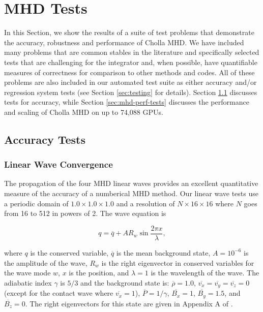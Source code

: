 \section{MHD Tests}
\label{sec:mhd-tests}

In this Section, we show the results of a suite of test problems that demonstrate the accuracy, robustness and performance of Cholla MHD. We have included many problems that are common stables in the literature and specifically selected tests that are challenging for the integrator and, when possible, have quantifiable measures of correctness for comparison to other methods and codes. All of these problems are also included in our automated test suite as either accuracy and/or regression system tests (see Section \ref{sec:testing} for details). Section \ref{sec:accuracy_tests} discusses tests for accuracy, while Section \ref{sec:mhd-perf-tests} discusses the performance and scaling of Cholla MHD on up to 74,088 GPUs.

\subsection{Accuracy Tests}
\label{sec:accuracy_tests}

\subsubsection{Linear Wave Convergence}
\label{sec:lwc}

The propagation of the four MHD linear waves provides an excellent quantitative measure of the accuracy of a numberical MHD method. Our linear wave tests use a periodic domain of $1.0\times1.0\times1.0$ and a resolution of $N\times16\times16$ where $N$ goes from 16 to 512 in powers of 2. The wave equation is

\begin{equation}
    q = \overline{q} + A R_w \sin{\frac{2\pi x}{\lambda}},
\end{equation}

\noindent where $q$ is the conserved variable, $\overline{q}$ is the mean background state, $A=10^{-6}$ is the amplitude of the wave, $R_w$ is the right eigenvector in conserved variables for the wave mode $w$, $x$ is the position, and $\lambda=1$ is the wavelength of the wave. The adiabatic index $\gamma$ is $5/3$ and the background state is: 
$\overline{\rho}=1.0$,
$\overline{v_x}=\overline{v_y}=\overline{v_z}=0$ (except for the contact wave where $\overline{v_x} = 1$),
$\overline{P}=1/\gamma$,
$\overline{B_x}=1$,
$\overline{B_y}=1.5$,
and $\overline{B_z}=0$.
The right eigenvectors for this state are given in Appendix A of \cite{gardiner_unsplit_2008}. 

